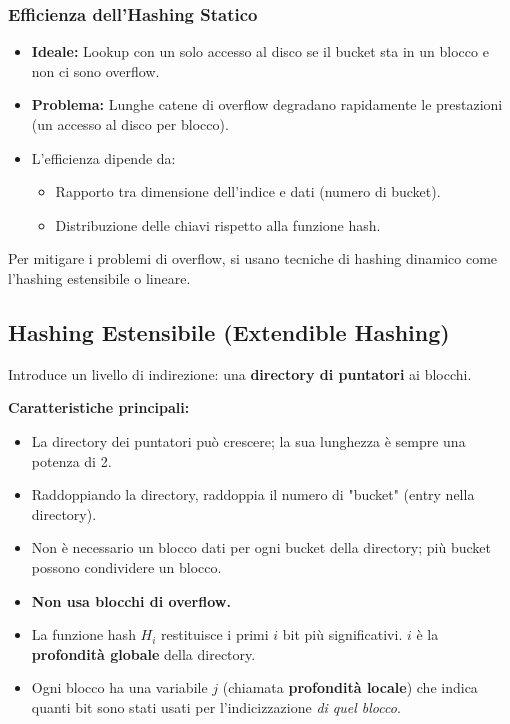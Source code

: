\subsubsection{Efficienza dell'Hashing Statico}
\begin{itemize}
    \item \textbf{Ideale:} Lookup con un solo accesso al disco se il bucket sta in un blocco e non ci sono overflow.
    \item \textbf{Problema:} Lunghe catene di overflow degradano rapidamente le prestazioni (un accesso al disco per blocco).
    \item L'efficienza dipende da:
    \begin{itemize}
        \item Rapporto tra dimensione dell'indice e dati (numero di bucket).
        \item Distribuzione delle chiavi rispetto alla funzione hash.
    \end{itemize}
\end{itemize}
Per mitigare i problemi di overflow, si usano tecniche di hashing dinamico come l'hashing estensibile o lineare.

\subsection{Hashing Estensibile (Extendible Hashing)}
Introduce un livello di indirezione: una \textbf{directory di puntatori} ai blocchi.

\textbf{Caratteristiche principali:}
\begin{itemize}
    \item La directory dei puntatori può crescere; la sua lunghezza è sempre una potenza di 2.
    \item Raddoppiando la directory, raddoppia il numero di "bucket" (entry nella directory).
    \item Non è necessario un blocco dati per ogni bucket della directory; più bucket possono condividere un blocco.
    \item \textbf{Non usa blocchi di overflow.}
    \item La funzione hash $H_i$ restituisce i primi $i$ bit più significativi. $i$ è la \textbf{profondità globale} della directory.
    \item Ogni blocco ha una variabile $j$ (chiamata \textbf{profondità locale}) che indica quanti bit sono stati usati per l'indicizzazione \textit{di quel blocco}.
\end{itemize}

